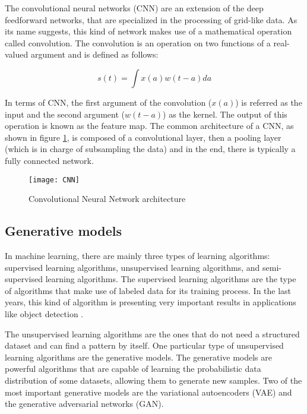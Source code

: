The convolutional neural networks (CNN) \cite{Lecun1999} are an extension of the deep feedforward networks, that are specialized in the processing of grid-like data. As its name suggests, this kind of network makes use of a mathematical operation called convolution. The convolution is an operation on two functions of a real-valued argument and is defined as follows:

\begin{equation}
 s(t)=\int x(a) w(t-a) d a
\end{equation}

In terms of CNN, the first argument of the convolution (\begin{math} x(a) \end{math}) is referred as the input and the second argument (\begin{math} w(t - a) \end{math}) as the kernel. The output of this operation is known as the feature map. The common architecture of a CNN, as shown in figure \ref{fig:cnn}, is composed of a convolutional layer, then a pooling layer (which is in charge of subsampling the data) and in the end, there is typically a fully connected network.

\begin{figure}[htb]
  \centering
  \texttt{[image: CNN]}
  \caption[Convolutional Neural Network architecture]{Convolutional Neural Network architecture}
  \label{fig:cnn}
\end{figure}

\subsection{Generative models}

In machine learning, there are mainly three types of learning algorithms: supervised learning algorithms, unsupervised learning algorithms, and semi-supervised learning algorithms. The supervised learning algorithms are the type of algorithms that make use of labeled data for its training process. In the last years, this kind of algorithm is presenting very important results in applications like object detection \cite{Liu2019}.

The unsupervised learning algorithms are the ones that do not need a structured dataset and can find a pattern by itself. One particular type of unsupervised learning algorithms are the generative models. The generative models are powerful algorithms that are capable of learning the probabilistic data distribution of some datasets, allowing them to generate new samples. Two of the most important generative models are the variational autoencoders (VAE) and the generative adversarial networks (GAN).

